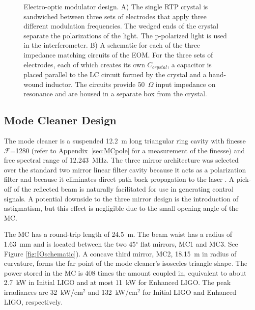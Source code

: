 \begin{figure}
\begin{centering}
  \caption[Electro-optic modulator design]{Electro-optic modulator
    design. A) The single RTP crystal is sandwiched between three sets
    of electrodes that apply three different modulation
    frequencies. The wedged ends of the crystal separate the
    polarizations of the light. The p-polarized light is used in the
    interferometer. B) A schematic for each of the three impedance
    matching circuits of the EOM. For the three sets of electrodes,
    each of which creates its own $C_{crystal}$, a capacitor is placed
    parallel to the LC circuit formed by the crystal and a hand-wound
    inductor.  The circuits provide 50~$\Omega$ input impedance on
    resonance and are housed in a separate box from the crystal.}
\label{fig:EOM}
\end{centering}
\end{figure}

\subsection{Mode Cleaner Design}
The mode cleaner is a suspended 12.2~m long triangular ring cavity
with finesse $\mathcal{F}$=1280 (refer to Appendix~\ref{sec:MCpole}
for a measurement of the finesse) and free spectral range of
12.243~MHz. The three mirror architecture was selected over the
standard two mirror linear filter cavity because it acts as a
polarization filter and because it eliminates direct path back
propagation to the laser \citep{Raab1992Estimation}.  A pick-off of the
reflected beam is naturally facilitated for use in generating control
signals. A potential downside to the three mirror design is the
introduction of astigmatism, but this effect is negligible due to the
small opening angle of the MC. 

The MC has a round-trip length of 24.5~m. The beam waist has a radius of
1.63~mm and is located between the two 45$^\circ$ flat mirrors, MC1 and
MC3. See Figure \ref{fig:IOschematic}). A concave third mirror, MC2,
18.15~m in radius of curvature, forms the far point of the mode
cleaner's isosceles triangle shape. The power stored in the MC is 408
times the amount coupled in, equivalent to about 2.7~kW in Initial
LIGO and at most 11~kW for Enhanced LIGO. The peak irradiances are
32~kW/cm$^2$ and 132~kW/cm$^2$ for Initial LIGO and Enhanced LIGO,
respectively.

